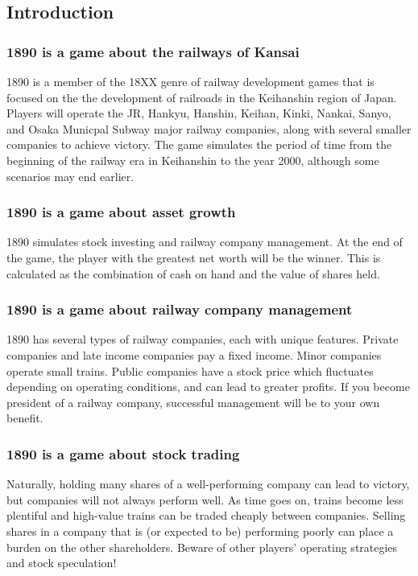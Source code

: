 \documentclass{article}
\begin{document}
\begin{CJK}{UTF8}{min}
\begin{multicols}{2}
\section*{Introduction}

\subsubsection*{1890 is a game about the railways of Kansai}
1890 is a member of the 18XX genre of railway development games that
is focused on the the development of railroads in the Keihanshin
region of Japan. Players will operate the JR, Hankyu, Hanshin, Keihan,
Kinki, Nankai, Sanyo, and Osaka Municpal Subway major railway
companies, along with several smaller companies to achieve
victory. The game simulates the period of time from the beginning of
the railway era in Keihanshin to the year 2000, although some
scenarios may end earlier.

\subsubsection*{1890 is a game about asset growth}
1890 simulates stock investing and railway company management. At the end
of the game, the player with the greatest net worth will be the
winner. This is calculated as the combination of cash on hand and
the value of shares held.

\subsubsection*{1890 is a game about railway company management}
1890 has several types of railway companies, each with unique
features. Private companies and late income companies pay a fixed
income. Minor companies operate small trains. Public companies have a
stock price which fluctuates depending on operating conditions, and
can lead to greater profits. If you become president of a railway
company, successful management will be to your own benefit.

\subsubsection*{1890 is a game about stock trading}
Naturally, holding many shares of a well-performing company can lead
to victory, but companies will not always perform well. As time goes
on, trains become less plentiful and high-value trains can be traded
cheaply between companies. Selling shares in a company that is (or
expected to be) performing poorly can place a burden on the other
shareholders. Beware of other players' operating strategies and stock
speculation!


\end{multicols}
\end{CJK}
\end{document}
